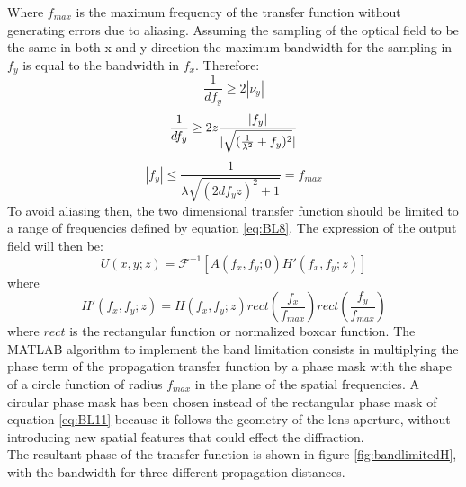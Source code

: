  Where $f_{max}$ is the maximum frequency of the transfer function without generating errors due to aliasing. Assuming the sampling of the optical field to be the same in both x and y direction the maximum bandwidth for the sampling in $f_y$ is equal to the bandwidth in $f_x $. Therefore:
 \begin{equation}
 \label{eq:BL7}
 \dfrac{1}{df_y}\geq 2|\nu_y|
 \end{equation}
 \begin{equation}
 \label{eq:BL8}
 \dfrac{1}{df_y}\geq 2 z\dfrac{|f_y|}{|\sqrt{(\frac{1}{\lambda^2}+f_y)^2}|}\\ 
 \end{equation}
 \begin{equation}
 \label{eq:BL9}
 |f_y|\leq\dfrac{1}{\lambda\sqrt{(2df_y z)^2+1}} = f_{max}
 \end{equation}
 To avoid aliasing then, the two dimensional transfer function should be limited to a range of frequencies defined by equation \ref{eq:BL8}.
 The expression of the output field will then be:
 \begin{equation}
 \label{eq:BL10}
 U(x,y;z)= \mathcal{F}^{-1}\left[A(f_x,f_y;0)H'(f_x,f_y;z)\right]
 \end{equation}
 where
 \begin{equation}
 \label{eq:BL11}
 H'(f_x,f_y;z)=H(f_x,f_y;z)rect\left(\dfrac{f_x}{f_{max}}\right)rect\left(\dfrac{f_y}{f_{max}}\right)
 \end{equation}
 where $rect$ is the rectangular function or normalized boxcar function.
 The MATLAB algorithm to implement the band limitation consists in multiplying the phase term of the propagation transfer function by a phase mask with the shape of a circle function of radius $f_{max}$ in the plane of the spatial frequencies. A circular phase mask has been chosen instead of the rectangular phase mask of equation \ref{eq:BL11} because it follows the geometry of the lens aperture, without introducing new spatial features that could effect the diffraction.\\ The resultant phase of the transfer function is shown in figure \ref{fig:bandlimitedH}, with the bandwidth for three different propagation distances.
